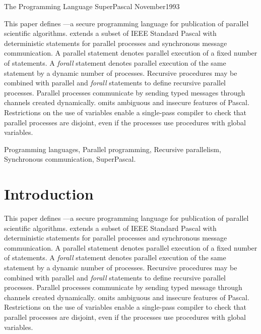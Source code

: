 \mytitle
  {The Programming Language SuperPascal}
  {November}{1993}

\begin{myabstract}
  This paper defines {\Superpascal}---a secure programming
  language for publication of parallel scientific
  algorithms. {\Superpascal} extends a subset of IEEE Standard
  Pascal with deterministic statements for parallel
  processes and synchronous message communication. A parallel
  statement denotes parallel execution of a fixed number of
  statements. A {\it forall} statement denotes parallel execution
  of the same statement by a dynamic number of processes.
  Recursive procedures may be combined with parallel and {\it
  forall} statements to define recursive parallel processes.
  Parallel processes communicate by sending typed messages
  through channels created dynamically. {\Superpascal} omits
  ambiguous and insecure features of Pascal. Restrictions on
  the use of variables enable a single-pass compiler to check
  that parallel processes are disjoint, even if the processes
  use procedures with global variables.
\end{myabstract}

\blankline

\begin{mykeywords}
  Programming languages, Parallel programming, Recursive
  parallelism, Synchronous communication, SuperPascal.
\end{mykeywords}



\section{Introduction}

This paper defines {\Superpascal}---a secure programming
language for publication of parallel scientific algorithms.
{\Superpascal} extends a subset of IEEE Standard Pascal with
deterministic statements for parallel processes and
synchronous message communication. A parallel statement
denotes parallel execution of a fixed number of statements.
A {\it forall} statement denotes parallel execution of the
same statement by a dynamic number of processes. Recursive
procedures may be combined with parallel and {\it forall}
statements to define recursive parallel processes. Parallel
processes communicate by sending typed message through
channels created dynamically. {\Superpascal} omits ambiguous
and insecure features of Pascal. Restrictions on the use of
variables enable a single-pass compiler to check that
parallel processes are disjoint, even if the processes use
procedures with global variables.

